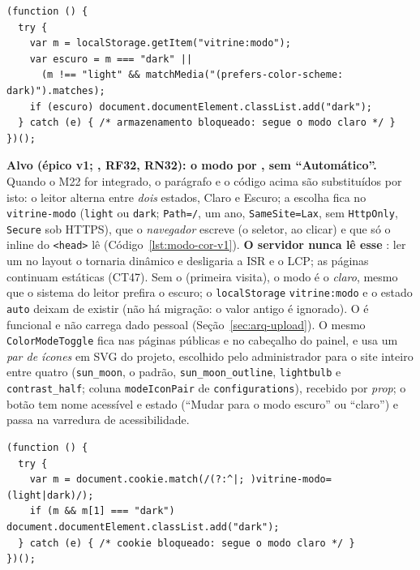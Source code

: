 \begin{lstlisting}[language=VJS, caption={Script do modo de cor no <head> do layout raiz (esboço normativo)}, label={lst:modo-cor}]
(function () {
  try {
    var m = localStorage.getItem("vitrine:modo");
    var escuro = m === "dark" ||
      (m !== "light" && matchMedia("(prefers-color-scheme: dark)").matches);
    if (escuro) document.documentElement.classList.add("dark");
  } catch (e) { /* armazenamento bloqueado: segue o modo claro */ }
})();
\end{lstlisting}

\textbf{Alvo (épico v1; , RF32, RN32): o modo por , sem ``Automático''.} Quando o M22 for integrado, o parágrafo e o código acima são substituídos por isto: o leitor alterna entre \emph{dois} estados, Claro e Escuro; a escolha fica no  \texttt{vitrine-modo} (\texttt{light} ou \texttt{dark}; \texttt{Path=/}, um ano, \texttt{SameSite=Lax}, sem \texttt{HttpOnly}, \texttt{Secure} sob HTTPS), que o \emph{navegador} escreve (o seletor, ao clicar) e que só o  inline do \texttt{<head>} lê (Código~\ref{lst:modo-cor-v1}). \textbf{O servidor nunca lê esse }: ler um  no layout o tornaria dinâmico e desligaria a ISR e o LCP; as páginas continuam estáticas (CT47). Sem o  (primeira visita), o modo é o \emph{claro}, mesmo que o sistema do leitor prefira o escuro; o \texttt{localStorage} \texttt{vitrine:modo} e o estado \texttt{auto} deixam de existir (não há migração: o valor antigo é ignorado). O  é funcional e não carrega dado pessoal (Seção~\ref{sec:arq-upload}). O mesmo \texttt{ColorModeToggle} fica nas páginas públicas e no cabeçalho do painel, e usa um \emph{par de ícones} em SVG  do projeto, escolhido pelo administrador para o site inteiro entre quatro (\texttt{sun\_moon}, o padrão, \texttt{sun\_moon\_outline}, \texttt{lightbulb} e \texttt{contrast\_half}; coluna \texttt{modeIconPair} de \texttt{configurations}), recebido por \emph{prop}; o botão tem nome acessível e estado (``Mudar para o modo escuro'' ou ``claro'') e passa na varredura de acessibilidade.

\begin{lstlisting}[language=VJS, caption={Script do modo de cor no <head> com o cookie (alvo, esboço normativo)}, label={lst:modo-cor-v1}]
(function () {
  try {
    var m = document.cookie.match(/(?:^|; )vitrine-modo=(light|dark)/);
    if (m && m[1] === "dark") document.documentElement.classList.add("dark");
  } catch (e) { /* cookie bloqueado: segue o modo claro */ }
})();
\end{lstlisting}

